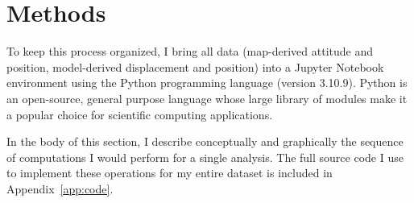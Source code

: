 \chapter{Methods}\label{cha:methods}


To keep this process organized, I bring all data (map-derived attitude and position, model-derived displacement and position) into a Jupyter Notebook environment using the Python programming language (version 3.10.9). Python is an open-source, general purpose language whose large library of modules make it a popular choice for scientific computing applications.

In the body of this section, I describe conceptually and graphically the sequence of computations I would perform for a single analysis. The full source code I use to implement these operations for my entire dataset is included in Appendix~\ref{app:code}.




